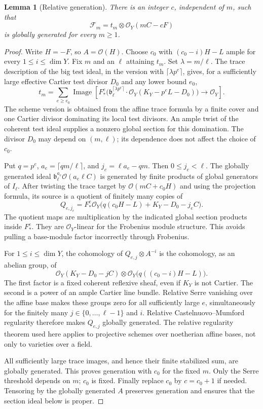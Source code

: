 \documentclass[11pt]{article}
\newtheorem{lemma}[theorem]{Lemma}
\newcommand{\OO}{\mathcal O}
\begin{document}
\begin{lemma}[Relative generation]\label{lem:gen}
There is an integer $c$, independent of $m$, such that
\[
 \mathscr F_m=t_m\otimes\OO_Y(mC-cF)
\]
is globally generated for every $m\geq1$.
\end{lemma}
\begin{proof}
Write $H=-F$, so $A=\OO(H)$. Choose $c_0$ with
$(c_0-i)H-L$ ample for every $1\leq i\leq\dim Y$.
Fix $m$ and an $\ell$ attaining $t_m$. Set $\lambda=m/\ell$.
The trace description of the big test ideal, in the version with
$\lceil\lambda p^e\rceil$, gives, for a sufficiently large effective
Cartier test divisor $D_0$ and any lower bound $e_0$,
\[
 t_m=\sum_{e\geq e_0}\operatorname{Image}\left[
 F_*^e\bigl(\mathfrak b_\ell^{\lceil\lambda p^e\rceil}
       \cdot\OO_Y(K_Y-p^eL-D_0)\bigr)\longrightarrow\OO_Y\right].
\]
The scheme version is obtained from the affine trace formula by a finite
cover and one Cartier divisor dominating its local test divisors. An ample
twist of the coherent test ideal supplies a nonzero global section for this
domination. The divisor $D_0$ may depend on $(m,\ell)$; its dependence
does not affect the choice of $c_0$.

Put $q=p^e$, $a_e=\lceil qm/\ell\rceil$, and
$j_e=\ell a_e-qm$. Then $0\leq j_e<\ell$.
The globally generated ideal
$\mathfrak b_\ell^{a_e}\OO(a_e\ell C)$ is generated by finite products
of global generators of $I_\ell$. After twisting the trace target by
$\OO(mC+c_0H)$ and using the projection formula, its source is a quotient
of finitely many copies of
\[
 Q_{e,j_e}=F_*^e\OO_Y\bigl(q(c_0H-L)+K_Y-D_0-j_eC\bigr).
\]
The quotient maps are multiplication by the indicated global section
products inside $F_*^e$. They are $\OO_Y$-linear for the Frobenius module
structure. This avoids pulling a base-module factor incorrectly through
Frobenius.

For $1\leq i\leq\dim Y$, the cohomology of $Q_{e,j}\otimes A^{-i}$ is
the cohomology, as an abelian group, of
\[
 \OO_Y(K_Y-D_0-jC)\otimes
 \OO_Y\bigl(q((c_0-i)H-L)\bigr).
\]
The first factor is a fixed coherent reflexive sheaf, even if $K_Y$ is
not Cartier. The second is a power of an ample Cartier line bundle.
Relative Serre vanishing over the affine base makes these groups zero
for all sufficiently large $e$, simultaneously for the finitely many
$j\in\{0,\ldots,\ell-1\}$ and $i$. Relative Castelnuovo--Mumford
regularity therefore makes $Q_{e,j}$ globally generated. The relative
regularity theorem used here applies to projective schemes over noetherian
affine bases, not only to varieties over a field.

All sufficiently large trace images, and hence their finite stabilized
sum, are globally generated. This proves generation with $c_0$ for the
fixed $m$. Only the Serre threshold depends on $m$; $c_0$ is fixed.
Finally replace $c_0$ by $c=c_0+1$ if needed. Tensoring by the globally
generated $A$ preserves generation and ensures that the section ideal
below is proper.
\end{proof}
\end{document}
